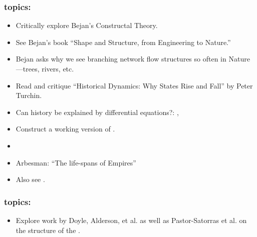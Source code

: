 \begin{frame}
  \frametitle{topics:}

  \begin{block}{}
    \begin{itemize}
    \item
      Critically explore Bejan's Constructal Theory.
    \item
      See Bejan's book ``Shape and Structure, from Engineering to Nature.''\cite{bejan2000a}
    \item
      Bejan asks why we see branching network flow structures so often in
      Nature---trees, rivers, etc.
    \end{itemize}
  \end{block}

  \begin{block}{}
    \begin{itemize}
    \item
      Read and critique ``Historical Dynamics:
      Why States Rise and Fall'' by Peter Turchin.\cite{turchin2003a}
    \item
      Can history be explained by differential equations?:
      ,
    \item
      Construct a working version of .
    \item
    \item
      Arbesman: ``The life-spans of Empires''\cite{arbesman2011a}
    \item
      Also see 
      .
    \end{itemize}
  \end{block}

\end{frame}

\begin{frame}
  \frametitle{topics:}

  \begin{block}{}
  \begin{itemize}
  \item
    Explore work by Doyle, Alderson, et al. 
    as well as Pastor-Satorras et al. on the structure 
    of the .
  \end{itemize}
  \end{block}

\end{frame}




